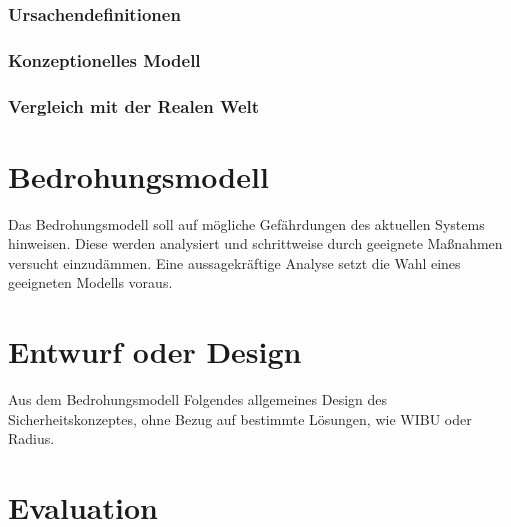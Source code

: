 \documentclass[11pt,a4paper]{report}
\begin{document}
\subsection{Ursachendefinitionen}

\subsection{Konzeptionelles Modell}

\subsection{Vergleich mit der Realen Welt}


\chapter{Bedrohungsmodell} \label{chap:threat}

Das Bedrohungsmodell soll auf mögliche Gefährdungen des aktuellen Systems hinweisen. Diese werden analysiert und schrittweise durch geeignete Maßnahmen versucht einzudämmen. Eine aussagekräftige Analyse setzt die Wahl eines geeigneten Modells voraus. 

\chapter{Entwurf oder Design} \label{chap:design}

Aus dem Bedrohungsmodell Folgendes allgemeines Design des Sicherheitskonzeptes, ohne Bezug auf bestimmte Lösungen, wie WIBU oder Radius.

\chapter{Evaluation} \label{chap:evaluation}
\end{document}
